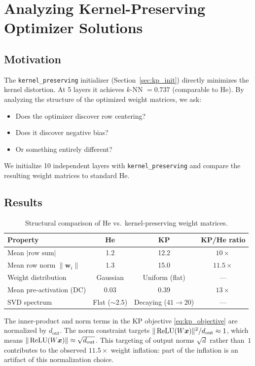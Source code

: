 \section{Analyzing Kernel-Preserving Optimizer Solutions}
\label{sec:kp_analysis}

\subsection{Motivation}

The \texttt{kernel\_preserving} initializer
(Section~\ref{sec:kp_init}) directly minimizes the kernel distortion.
At 5 layers it achieves $k$-NN $= 0.737$ (comparable to He).
By analyzing the structure of the optimized weight matrices, we ask:
\begin{itemize}
  \item Does the optimizer discover row centering?
  \item Does it discover negative bias?
  \item Or something entirely different?
\end{itemize}

We initialize 10 independent layers with \texttt{kernel\_preserving}
and compare the resulting weight matrices to standard He.

\subsection{Results}

\begin{table}[h]
\centering
\begin{tabular}{lccc}
\toprule
Property & He & KP & KP/He ratio \\
\midrule
Mean $|\text{row sum}|$ & 1.2 & 12.2 & $10\times$ \\
Mean row norm $\|\bm{w}_i\|$ & 1.3 & 15.0 & $11.5\times$ \\
Weight distribution & Gaussian & Uniform (flat) & --- \\
Mean pre-activation (DC) & 0.03 & 0.39 & $13\times$ \\
SVD spectrum & Flat ($\sim\!2.5$) & Decaying ($41 \to 20$) & --- \\
\bottomrule
\end{tabular}
\caption{Structural comparison of He vs.\ kernel-preserving weight matrices.}
\label{tab:kp_structure}
\end{table}

\begin{flagbox}
The inner-product and norm terms in the KP objective
\eqref{eq:kp_objective} are normalized by $d_{\mathrm{out}}$.
The norm constraint targets
$\|\operatorname{ReLU}(W\bm{x})\|^2 / d_{\mathrm{out}} \approx 1$,
which means $\|\operatorname{ReLU}(W\bm{x})\| \approx \sqrt{d_{\mathrm{out}}}$.
This targeting of output norms $\sqrt{d}$ rather than~$1$ contributes
to the observed $11.5\times$ weight inflation: part of the inflation
is an artifact of this normalization choice.
\end{flagbox}

